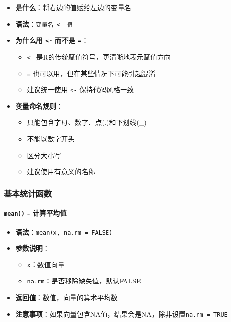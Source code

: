 \documentclass[
  twoside]{book}
\providecommand{\tightlist}{%
  \setlength{\itemsep}{0pt}\setlength{\parskip}{0pt}}
\begin{document}
\begin{itemize}
\tightlist
\item
  \textbf{是什么}：将右边的值赋给左边的变量名
\item
  \textbf{语法}：\texttt{变量名\ \textless{}-\ 值}
\item
  \textbf{为什么用 \texttt{\textless{}-} 而不是 \texttt{=}}：

  \begin{itemize}
  \tightlist
  \item
    \texttt{\textless{}-} 是R的传统赋值符号，更清晰地表示赋值方向
  \item
    \texttt{=} 也可以用，但在某些情况下可能引起混淆
  \item
    建议统一使用 \texttt{\textless{}-} 保持代码风格一致
  \end{itemize}
\item
  \textbf{变量命名规则}：

  \begin{itemize}
  \tightlist
  \item
    只能包含字母、数字、点(.)和下划线(\_)
  \item
    不能以数字开头
  \item
    区分大小写
  \item
    建议使用有意义的名称
  \end{itemize}
\end{itemize}

\hypertarget{ux57faux672cux7edfux8ba1ux51fdux6570}{%
\subsubsection{基本统计函数}\label{ux57faux672cux7edfux8ba1ux51fdux6570}}

\hypertarget{mean---ux8ba1ux7b97ux5e73ux5747ux503c}{%
\paragraph{\texorpdfstring{\texttt{mean()} - 计算平均值}{mean() - 计算平均值}}\label{mean---ux8ba1ux7b97ux5e73ux5747ux503c}}

\begin{itemize}
\tightlist
\item
  \textbf{语法}：\texttt{mean(x,\ na.rm\ =\ FALSE)}
\item
  \textbf{参数说明}：

  \begin{itemize}
  \tightlist
  \item
    \texttt{x}：数值向量
  \item
    \texttt{na.rm}：是否移除缺失值，默认FALSE
  \end{itemize}
\item
  \textbf{返回值}：数值，向量的算术平均数
\item
  \textbf{注意事项}：如果向量包含NA值，结果会是NA，除非设置\texttt{na.rm\ =\ TRUE}
\end{itemize}
\end{document}
